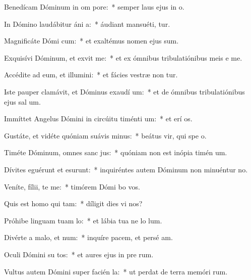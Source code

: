 \item Benedícam Dóminum in om pore:~* semper laus ejus in  o.
\item In Dómino laudábitur áni a:~* áudiant mansuéti,  tur.
\item Magnificáte Dómi cum:~* et exaltémus nomen ejus  sum.
\item Exquisívi Dóminum, et exvit me:~* et ex ómnibus tribulatiónibus meis e me.
\item Accédite ad eum, et illumini:~* et fácies vestræ non tur.
\item Iste pauper clamávit, et Dóminus exaudí um:~* et de ómnibus tribulatiónibus ejus sal um.
\item Immíttet Angelus Dómini in circúitu timénti um:~* et erí os.
\item Gustáte, et vidéte quóniam suávis  minus:~* beátus vir, qui spe  o.
\item Timéte Dóminum, omnes sanc jus:~* quóniam non est inópia timén um.
\item Dívites eguérunt et esurunt:~* inquiréntes autem Dóminum non minuéntur  no.
\item Veníte, fílii, te me:~* timórem Dómi bo vos.
\item Quis est homo qui  tam:~* díligit dies vi nos?
\item Próhibe linguam tuam  lo:~* et lábia tua ne lo lum.
\item Divérte a malo, et  num:~* inquíre pacem, et persé am.
\item Oculi Dómini su tos:~* et aures ejus in pre rum.
\item Vultus autem Dómini super facién la:~* ut perdat de terra memóri rum.
